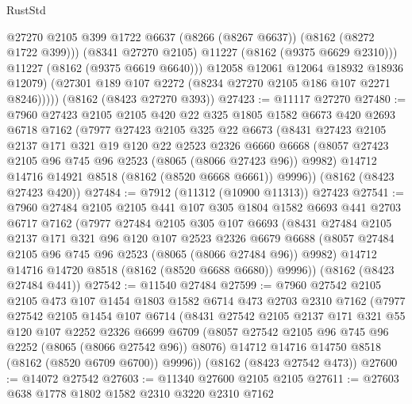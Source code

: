 \begin{lexlean}{RustStd}
\begin{coremodule}
                  @27270
                  @2105
                  @399
                  @1722
                  @6637
                  (@8266 (@8267 @6637))
                  (@8162 (@8272 @1722 @399)))
                (@8341 @27270 @2105)
                @11227
                (@8162 (@9375 @6629 @2310)))
              @11227
              (@8162 (@9375 @6619 @6640)))
            @12058
            @12061
            @12064
            @18932
            @18936
            @12079)
          (@27301 @189 @107 @2272 (@8234 @27270 @2105 @186 @107 @2271 @8246)))))
    (@8162 (@8423 @27270 @393))
@27423 := @11117 @27270
@27480 := @7960
    @27423
    @2105
    @2105
    @420
    @22
    @325
    @1805
    @1582
    @6673
    @420
    @2693
    @6718
    @7162
    (@7977
      @27423
      @2105
      @325
      @22
      @6673
      (@8431
        @27423
        @2105
        @2137
        @171
        @321
        @19
        @120
        @22
        @2523
        @2326
        @6660
        @6668
        (@8057 @27423 @2105 @96 @745 @96 @2523 (@8065 (@8066 @27423 @96)) @9982)
        @14712
        @14716
        @14921
        @8518
        (@8162 (@8520 @6668 @6661))
        @9996))
    (@8162 (@8423 @27423 @420))
@27484 := @7912 (@11312 (@10900 @11313)) @27423
@27541 := @7960
    @27484
    @2105
    @2105
    @441
    @107
    @305
    @1804
    @1582
    @6693
    @441
    @2703
    @6717
    @7162
    (@7977
      @27484
      @2105
      @305
      @107
      @6693
      (@8431
        @27484
        @2105
        @2137
        @171
        @321
        @96
        @120
        @107
        @2523
        @2326
        @6679
        @6688
        (@8057 @27484 @2105 @96 @745 @96 @2523 (@8065 (@8066 @27484 @96)) @9982)
        @14712
        @14716
        @14720
        @8518
        (@8162 (@8520 @6688 @6680))
        @9996))
    (@8162 (@8423 @27484 @441))
@27542 := @11540 @27484
@27599 := @7960
    @27542
    @2105
    @2105
    @473
    @107
    @1454
    @1803
    @1582
    @6714
    @473
    @2703
    @2310
    @7162
    (@7977
      @27542
      @2105
      @1454
      @107
      @6714
      (@8431
        @27542
        @2105
        @2137
        @171
        @321
        @55
        @120
        @107
        @2252
        @2326
        @6699
        @6709
        (@8057 @27542 @2105 @96 @745 @96 @2252 (@8065 (@8066 @27542 @96)) @8076)
        @14712
        @14716
        @14750
        @8518
        (@8162 (@8520 @6709 @6700))
        @9996))
    (@8162 (@8423 @27542 @473))
@27600 := @14072 @27542
@27603 := @11340 @27600 @2105 @2105
@27611 := @27603 @638 @1778 @1802 @1582 @2310 @3220 @2310 @7162

\end{coremodule}
\end{lexlean}
